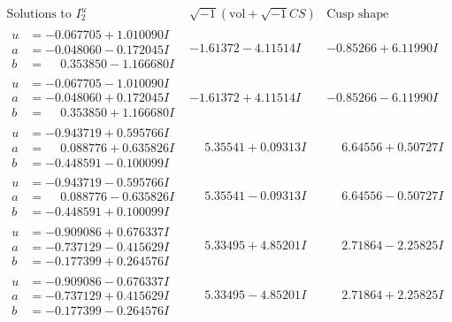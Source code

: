\documentclass[1p]{elsarticle_modified}
\theoremstyle{definition}
\newcommand{\I}{\sqrt{-1}}
\begin{document}
$$\begin{array}{c|c|c}  
\text{Solutions to }I^u_{2}& \I (\text{vol} + \sqrt{-1}CS) & \text{Cusp shape}\\
 \hline 
\begin{aligned}
u &= -0.067705 + 1.010090 I \\
a &= -0.048060 - 0.172045 I \\
b &= \phantom{-}0.353850 - 1.166680 I\end{aligned}
 & -1.61372 - 4.11514 I & -0.85266 + 6.11990 I \\ \hline\begin{aligned}
u &= -0.067705 - 1.010090 I \\
a &= -0.048060 + 0.172045 I \\
b &= \phantom{-}0.353850 + 1.166680 I\end{aligned}
 & -1.61372 + 4.11514 I & -0.85266 - 6.11990 I \\ \hline\begin{aligned}
u &= -0.943719 + 0.595766 I \\
a &= \phantom{-}0.088776 + 0.635826 I \\
b &= -0.448591 - 0.100099 I\end{aligned}
 & \phantom{-}5.35541 + 0.09313 I & \phantom{-}6.64556 + 0.50727 I \\ \hline\begin{aligned}
u &= -0.943719 - 0.595766 I \\
a &= \phantom{-}0.088776 - 0.635826 I \\
b &= -0.448591 + 0.100099 I\end{aligned}
 & \phantom{-}5.35541 - 0.09313 I & \phantom{-}6.64556 - 0.50727 I \\ \hline\begin{aligned}
u &= -0.909086 + 0.676337 I \\
a &= -0.737129 - 0.415629 I \\
b &= -0.177399 + 0.264576 I\end{aligned}
 & \phantom{-}5.33495 + 4.85201 I & \phantom{-}2.71864 - 2.25825 I \\ \hline\begin{aligned}
u &= -0.909086 - 0.676337 I \\
a &= -0.737129 + 0.415629 I \\
b &= -0.177399 - 0.264576 I\end{aligned}
 & \phantom{-}5.33495 - 4.85201 I & \phantom{-}2.71864 + 2.25825 I \\ \hline\begin{aligned}

\end{aligned}
\end{array}$$
\end{document}
